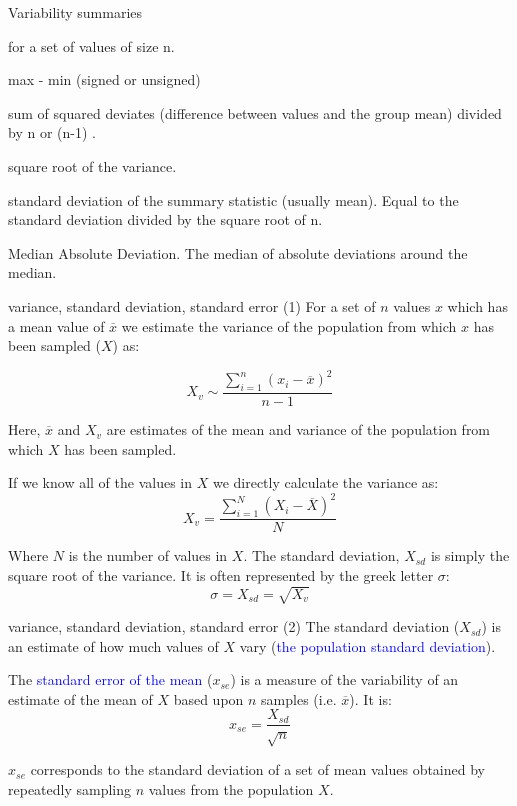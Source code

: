 \documentclass[pdf]{beamer}
\begin{document}
\begin{frame}{Variability summaries}

for a set of values of size n.

\begin{description} \pause
\item[range] max - min (signed or unsigned) \pause
\item[variance] sum of squared deviates (difference between values and the
  group mean) divided by n or (n-1) .\pause
\item[standard deviation] square root of the variance. \pause
\item[standard error] standard deviation of the summary statistic (usually
  mean). Equal to the standard deviation divided by the square root of n. \pause
\item[MAD] Median Absolute Deviation. The median of absolute deviations around
  the median.
\end{description}
\end{frame}

\begin{frame}{variance, standard deviation, standard error (1)}
  \small
  For a set of $n$ values $x$
  which has a mean value of $\overline{x}$
  we estimate the variance of the population from which $x$ has been
  sampled ($X$) as:
  
  $$ X_v \sim \frac{\sum_{i=1}^{n}{(x_i - \overline{x})^2}}{n-1} $$ 
  
  Here, $\overline{x}$ and $X_v$ are estimates of the 
  mean and variance of the population from which $X$ has
  been sampled.

  If we know all of the values in $X$ we directly calculate the variance as:
  $$X_v = \frac{\sum_{i=1}^{N}{(X_i - \overline{X})^2}}{N} $$ 

  Where $N$ is the number of values in $X$. The standard deviation, $X_{sd}$
  is simply the square root of the variance. It is often represented by the
  greek letter $\sigma$:
  $$\sigma = X_{sd} = \sqrt{X_v}$$ 

\end{frame}

\begin{frame}{variance, standard deviation, standard error (2)}
  The standard deviation ($X_{sd}$) is an estimate of how much values of
  $X$ vary (\textcolor{blue}{the population standard deviation}). 

  The \textcolor{blue}{standard error of the mean} ($x_{se}$) 
  is a measure of the variability of an estimate of
  the mean of $X$ based upon $n$ samples (i.e. $\overline{x}$). It is:
  $$ x_{se} = \frac{X_{sd}}{\sqrt{n}} $$

  $x_{se}$ corresponds to the standard deviation of a set of mean values
  obtained by repeatedly sampling $n$ values from the population $X$.
\end{frame}
\end{document}
